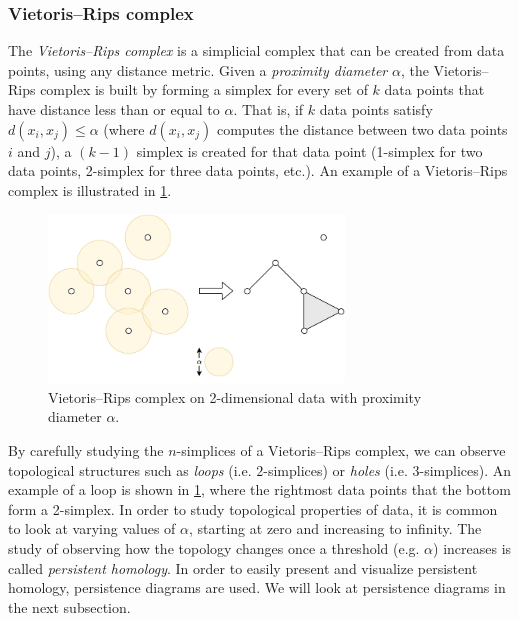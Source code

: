 \subsubsection{Vietoris–Rips complex}
\label{sec:vietoris-rips-complex}
The \textit{Vietoris–Rips complex} is a simplicial complex that can be created from data points, using any distance metric. Given a \textit{proximity diameter} $\alpha$, the Vietoris–Rips complex is built by forming a simplex for every set of $k$ data points that have distance less than or equal to $\alpha$. That is, if $k$ data points satisfy $d(x_i, x_j) \leq \alpha$ (where $d(x_i, x_j)$ computes the distance between two data points $i$ and $j$), a $(k-1)$ simplex is created for that data point (1-simplex for two data points, 2-simplex for three data points, etc.). An example of a Vietoris–Rips complex is illustrated in \cref{fig:simplicial-complex-rips}.
\begin{figure}[H]
    \centering
    \includegraphics[width=0.7\textwidth]{thesis/figures/simplicial-complex-rips_cropped.pdf}
    \caption{Vietoris–Rips complex on 2-dimensional data with proximity diameter $\alpha$.}
    \label{fig:simplicial-complex-rips}
\end{figure}
By carefully studying the $n$-simplices of a Vietoris–Rips complex, we can observe topological structures such as \textit{loops} (i.e. $2$-simplices) or \textit{holes}  (i.e. $3$-simplices). An example of a loop is shown in \cref{fig:simplicial-complex-rips}, where the rightmost data points that the bottom form a 2-simplex. In order to study topological properties of data, it is common to look at varying values of $\alpha$, starting at zero and increasing to infinity. The study of observing how the topology changes once a threshold (e.g. $\alpha$) increases is called \textit{persistent homology}. In order to easily present and visualize persistent homology, persistence diagrams are used. We will look at persistence diagrams in the next subsection.

